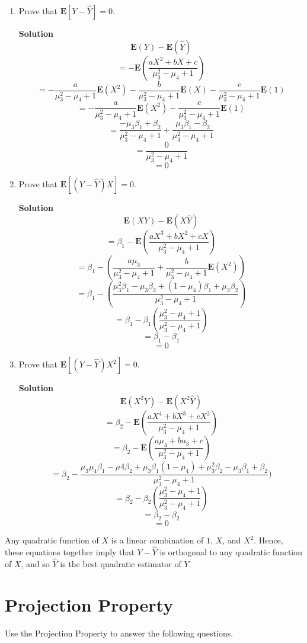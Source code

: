 \documentclass[11pt]{article}
\newcommand*{\Question}[1]{\section{#1}}
\newenvironment{Parts}{\begin{enumerate}[label=(\alph*)]}{\end{enumerate}}
\newcommand*{\Part}{\item}
\newenvironment{Answer}{\vspace{10pt}\begin{mdframed}\textbf{Solution}\\}{\end{mdframed}\vfill\pagebreak[3]}
\newenvironment{Answer}{\vspace{10pt}}{\vfill\pagebreak[3]}
\newcommand*{\E}{\textbf{E}}
\begin{document}
\begin{Parts}
  \Part Prove that $\E[Y - \hat{Y}] = 0$.
  \begin{Answer}
    $$\E(Y)-\E(\hat{Y})$$
    $$=-\E(\frac{a X^2 + b X + c}{\mu_3^2 - \mu_4 + 1})$$
    $$=-\frac{a}{\mu_3^2 - \mu_4 + 1}\E(X^2)-\frac{b}{\mu_3^2 - \mu_4 + 1}\E(X)-\frac{c}{\mu_3^2 - \mu_4 + 1}\E(1)$$
    $$=-\frac{a}{\mu_3^2 - \mu_4 + 1}\E(X^2)-\frac{c}{\mu_3^2 - \mu_4 + 1}\E(1)$$
    $$=\frac{-\mu_3\beta_1+\beta_2}{\mu_3^2 - \mu_4 + 1}+\frac{\mu_3\beta_1-\beta_2}{\mu_3^2 - \mu_4 + 1}$$
    $$=\frac{0}{\mu_3^2 - \mu_4 + 1}$$
    $$=0$$
  \end{Answer}

  \Part Prove that $\E[(Y - \hat{Y})X] = 0$.
  \begin{Answer}
    $$\E(XY)-\E(X\hat{Y})$$
    $$=\beta_1-\E(\frac{aX^3+bX^2+cX}{\mu_3^2 - \mu_4 + 1})$$
    $$=\beta_1-(\frac{a\mu_3}{\mu_3^2 - \mu_4 + 1}+\frac{b}{\mu_3^2 - \mu_4 + 1}\E(X^2))$$
    $$=\beta_1-(\frac{\mu_3^2\beta_1-\mu_3\beta_2+(1-\mu_4)\beta_1+\mu_3\beta_2}{\mu_3^2 - \mu_4 + 1})$$
    $$=\beta_1-\beta_1(\frac{\mu_3^2 - \mu_4 + 1}{\mu_3^2 - \mu_4 + 1})$$
    $$=\beta_1-\beta_1$$
    $$=0$$
  \end{Answer}
  
  \Part Prove that $\E[(Y - \hat{Y})X^2] = 0$.
  \begin{Answer}
    $$\E(X^2Y)-\E(X^2\hat{Y})$$
    $$=\beta_2-\E(\frac{aX^4+bX^3+cX^2}{\mu_3^2 - \mu_4 + 1})$$
    $$=\beta_2-\E(\frac{a\mu_4+bu_3+c}{\mu_3^2 - \mu_4 + 1})$$
    $$=\beta_2-\frac{\mu_3\mu_4\beta_1-\mu4\beta_2+\mu_3\beta_1(1-\mu_4)+\mu_3^2\beta_2-\mu_3\beta_1+\beta_2}{\mu_3^2 - \mu_4 + 1})$$
    $$=\beta_2-\beta_2(\frac{\mu_3^2 - \mu_4 + 1}{\mu_3^2 - \mu_4 + 1})$$
    $$=\beta_2-\beta_2$$
    $$=0$$
  \end{Answer}  
\end{Parts}
Any quadratic function of $X$ is a linear combination of $1$, $X$, and $X^2$. Hence, these equations together imply that $Y - \hat{Y}$ is orthogonal to any quadratic function of $X$, and so $\hat{Y}$ is the best quadratic estimator of $Y$.


\Question{Projection Property}

Use the Projection Property to answer the following questions.
\end{document}
